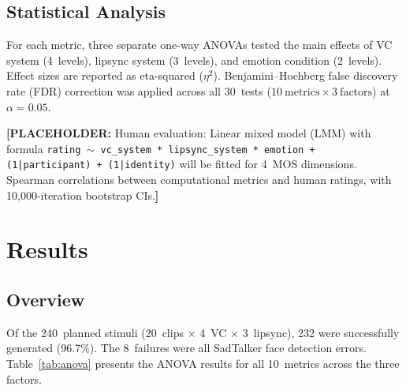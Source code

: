 \documentclass[11pt,a4paper]{article}
\newcommand{\placeholder}[1]{\textcolor{red!70!black}{\textbf{[PLACEHOLDER:} #1\textbf{]}}}
\begin{document}
\subsection{Statistical Analysis}

For each metric, three separate one-way ANOVAs tested the main effects of VC system (4~levels), lipsync system (3~levels), and emotion condition (2~levels).
Effect sizes are reported as eta-squared ($\eta^2$).
Benjamini--Hochberg false discovery rate (FDR) correction was applied across all 30~tests ($10~\text{metrics} \times 3~\text{factors}$) at $\alpha = 0.05$.

\placeholder{Human evaluation: Linear mixed model (LMM) with formula \texttt{rating $\sim$ vc\_system * lipsync\_system * emotion + (1|participant) + (1|identity)} will be fitted for 4~MOS dimensions. Spearman correlations between computational metrics and human ratings, with 10,000-iteration bootstrap CIs.}

\section{Results}
\label{sec:results}

\subsection{Overview}

Of the 240~planned stimuli (20~clips $\times$ 4~VC $\times$ 3~lipsync), 232 were successfully generated (96.7\%).
The 8~failures were all SadTalker face detection errors.
Table~\ref{tab:anova} presents the ANOVA results for all 10~metrics across the three factors.
\end{document}
